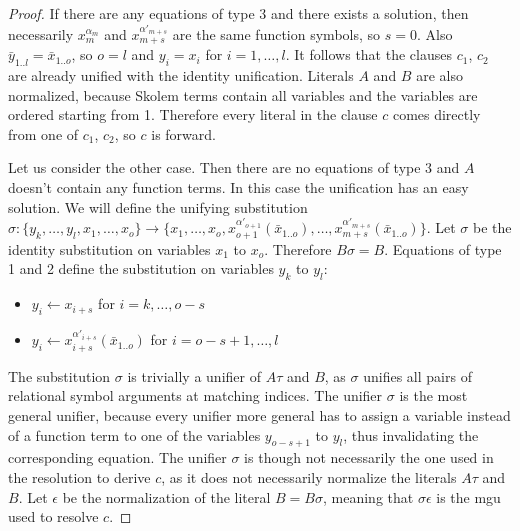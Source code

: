 \documentclass[english, shortabstract]{iithesis}
\theoremstyle{definition} \newtheorem{definition}{Definition}[chapter]
\theoremstyle{remark} \newtheorem{remark}[definition]{Observation}
\theoremstyle{plain} \newtheorem{theorem}[definition]{Theorem}
\theoremstyle{plain} \newtheorem{lemma}[definition]{Lemma}
\begin{document}
\begin{proof}
If there are any equations of type 3 and there exists a solution, then
necessarily $x^{\alpha_m}_m$ and $x^{\alpha'_{m+s}}_{m+s}$ are the same function symbols, so $s=0$.
Also $\bar{y}_{1..l}=\bar{x}_{1..o}$, so $o=l$ and $y_i=x_i$ for $i=1,\dots,l$.
It follows that the clauses $c_1$, $c_2$ are already unified with the identity unification.
Literals $A$ and $B$ are also normalized, because Skolem terms contain all variables and the variables are ordered starting from 1.
Therefore every literal in the clause $c$ comes directly from one of $c_1$, $c_2$, so $c$ is forward.

Let us consider the other case. Then there are no equations of type 3 and $A$ doesn't contain any function terms.
In this case the unification has an easy solution. %
We will define the unifying substitution $\sigma : \{y_k,\dots,y_l, x_1, \dots, x_o\} \rightarrow \{x_1,\dots, x_o, x^{\alpha'_{o+1}}_{o+1}(\bar{x}_{1..o}), \dots, x^{\alpha'_{m+s}}_{m+s}(\bar{x}_{1..o})\}$.
Let $\sigma$ be the identity substitution on variables $x_1$ to $x_o$. Therefore $B\sigma=B$.
Equations of type 1 and 2 define the substitution on variables $y_k$ to $y_l$:
\begin{itemize}
    \item $y_i \leftarrow x_{i+s}$ for $i=k,\dots, o-s$
    \item $y_i \leftarrow x^{\alpha'_{i+s}}_{i+s}(\bar{x}_{1..o})$ for $i=o-s+1,\dots, l$
\end{itemize}
The substitution $\sigma$ is trivially a unifier of $A\tau$ and $B$, as
$\sigma$ unifies all pairs of relational symbol arguments at matching indices.
The unifier $\sigma$ is the most general unifier, because every unifier more general
has to assign a variable instead of a function term to one of the variables $y_{o-s+1}$ to $y_l$, 
thus invalidating the corresponding equation. The unifier $\sigma$ is though not necessarily
the one used in the resolution to derive $c$, as it does not necessarily normalize the literals $A\tau$ and $B$.
Let $\epsilon$ be the normalization of the literal $B=B\sigma$, meaning that $\sigma\epsilon$ is the mgu used to resolve $c$.


\end{proof}
\end{document}
